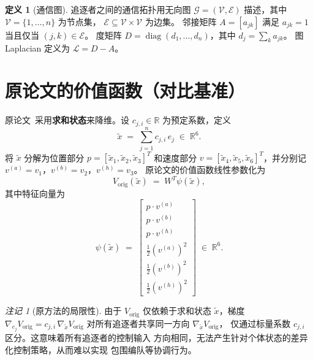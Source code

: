 \documentclass[a4paper,11pt]{article}
\theoremstyle{plain}
\theoremstyle{definition}
\newtheorem{definition}[theorem]{定义}
\theoremstyle{remark}
\newtheorem{remark}[theorem]{注记}
\DeclareMathOperator{\diag}{diag}
\newcommand{\R}{\mathbb{R}}
\newcommand{\cG}{\mathcal{G}}
\newcommand{\cV}{\mathcal{V}}
\newcommand{\cE}{\mathcal{E}}
\newcommand{\cL}{\mathcal{L}}
\begin{document}
\begin{definition}[通信图]\label{def:comm_graph}
  追逐者之间的通信拓扑用无向图
  $\cG = (\cV, \cE)$ 描述，其中 $\cV = \{1,\dots,n\}$ 为节点集，
  $\cE \subseteq \cV \times \cV$ 为边集。
  邻接矩阵 $A = [a_{jk}]$ 满足 $a_{jk} = 1$ 当且仅当 $(j,k)\in\cE$。
  度矩阵 $D = \diag(d_1,\dots,d_n)$，其中 $d_j = \sum_k a_{jk}$。
  图 Laplacian 定义为 $\cL = D - A$。
\end{definition}

\section{原论文的价值函数（对比基准）}\label{sec:original}

原论文~\cite{vsnac_original}采用\textbf{求和状态}来降维。设
$c_{j,i}\in\R$ 为预定系数，定义
\begin{equation}\label{eq:sum_state}
  \tilde{x} \;=\; \sum_{j=1}^{n} c_{j,i}\, e_j \;\in\; \R^6.
\end{equation}
将 $\tilde{x}$ 分解为位置部分 $p = [\tilde{x}_1,\tilde{x}_2,\tilde{x}_3]^T$
和速度部分 $v = [\tilde{x}_4,\tilde{x}_5,\tilde{x}_6]^T$，并分别记
$v^{(a)} = v_1$，$v^{(b)} = v_2$，$v^{(h)} = v_3$。
原论文的价值函数线性参数化为
\begin{equation}\label{eq:V_orig}
  V_{\text{orig}}(\tilde{x}) \;=\; W^T \psi(\tilde{x}),
\end{equation}
其中特征向量为
\begin{equation}\label{eq:psi_orig}
  \psi(\tilde{x}) \;=\;
  \begin{bmatrix}
    p \cdot v^{(a)} \\[2pt] p \cdot v^{(b)} \\[2pt] p \cdot v^{(h)} \\[4pt]
    \tfrac{1}{2}(v^{(a)})^2 \\[2pt] \tfrac{1}{2}(v^{(b)})^2 \\[2pt]
    \tfrac{1}{2}(v^{(h)})^2
  \end{bmatrix}
  \;\in\; \R^6.
\end{equation}

\begin{remark}[原方法的局限性]\label{rmk:orig_limitation}
  由于 $V_{\text{orig}}$ 仅依赖于求和状态 $\tilde{x}$，梯度
  $\nabla_{e_j} V_{\text{orig}} = c_{j,i}\, \nabla_{\tilde{x}} V_{\text{orig}}$
  对所有追逐者共享同一方向 $\nabla_{\tilde{x}} V_{\text{orig}}$，
  仅通过标量系数 $c_{j,i}$ 区分。这意味着所有追逐者的控制输入
  方向相同，无法产生针对个体状态的差异化控制策略，从而难以实现
  包围编队等协调行为。
\end{remark}
\end{document}
